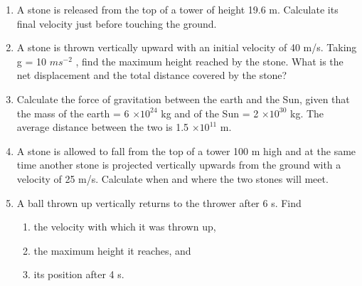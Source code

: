 \begin{enumerate}[label=\arabic*.,ref=\thesection.\theenumi]
\item  A stone is released from the top of a tower of height 19.6 m. Calculate its final velocity just before touching the ground.
\item  A stone is thrown vertically upward with an initial velocity of 40 m/s. Taking g = 10 $ms^{-2}$
, find the maximum height reached
by the stone. What is the net displacement and the total distance covered by the stone?
\item  Calculate the force of gravitation between the earth and the Sun, given that the mass of the earth = 6 $\times 10^{24}$
kg and of the
Sun = 2 $\times 10^{30}$ kg. The average distance between the two is 1.5 $\times 10^{11}$
m.
\item  A stone is allowed to fall from the top of a tower 100 m high and at the same time another stone is projected vertically upwards from the ground with a velocity of 25 m/s. Calculate when and where the two stones will meet.
\item  A ball thrown up vertically returns to the thrower after 6 s. Find
\begin{enumerate} 
\item the velocity with which it was thrown up, 
\item the maximum height it reaches, and 
\item  its position after 4 s.
\end{enumerate}


\end{enumerate}
